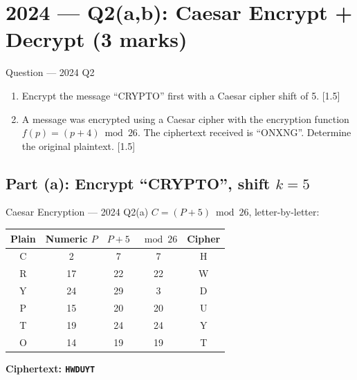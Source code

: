 \documentclass[12pt,a4paper]{article}
\begin{document}
\newpage
\section{2024 --- Q2(a,b): Caesar Encrypt + Decrypt (3 marks)}

\begin{qbox}{Question --- 2024 Q2}
\begin{enumerate}[label=(\alph*)]
  \item Encrypt the message ``CRYPTO'' first with a Caesar cipher shift of 5. \hfill [1.5]
  \item A message was encrypted using a Caesar cipher with the encryption function $f(p)=(p+4)\bmod 26$. The ciphertext received is ``ONXNG''. Determine the original plaintext. \hfill [1.5]
\end{enumerate}
\end{qbox}

\subsection{Part (a): Encrypt ``CRYPTO'', shift $k=5$}
\begin{solbox}{Caesar Encryption --- 2024 Q2(a)}
$C=(P+5)\bmod 26$, letter-by-letter:
\begin{center}
\renewcommand{\arraystretch}{1.3}
\begin{tabular}{c|c|c|c|c}
\toprule
Plain & Numeric $P$ & $P+5$ & $\bmod 26$ & Cipher \\
\midrule
C & 2  & 7  & 7  & H \\
R & 17 & 22 & 22 & W \\
Y & 24 & 29 & 3  & D \\
P & 15 & 20 & 20 & U \\
T & 19 & 24 & 24 & Y \\
O & 14 & 19 & 19 & T \\
\bottomrule
\end{tabular}
\end{center}
\textbf{Ciphertext: \texttt{HWDUYT}}
\end{solbox}
\end{document}
